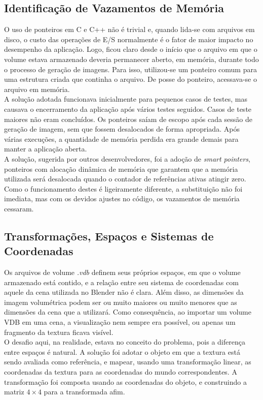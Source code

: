 \subsection*{Identificação de Vazamentos de Memória}
O uso de ponteiros em C e C++ não é trivial e, quando lida-se com arquivos em disco, o custo das operações de E/S normalmente é o fator de maior impacto no desempenho da aplicação. Logo, ficou claro desde o início que o arquivo em que o volume estava armazenado deveria permanecer aberto, em memória, durante todo o processo de geração de imagens. Para isso, utilizou-se um ponteiro comum para uma estrutura criada que continha o arquivo. De posse do ponteiro, acessava-se o arquivo em memória.\\

A solução adotada funcionava inicialmente para pequenos casos de testes, mas causava o encerramento da aplicação após vários testes seguidos. Casos de teste maiores não eram concluídos. Os ponteiros saíam de escopo após cada sessão de geração de imagem, sem que fossem desalocados de forma apropriada. Após várias execuções, a quantidade de memória perdida era grande demais para manter a aplicação aberta.\\

A solução, sugerida por outros desenvolvedores, foi a adoção de \emph{smart pointers}, ponteiros com alocação dinâmica de memória que garantem que a memória utilizada será desalocada quando o contador de referências ativas atingir zero. Como o funcionamento destes é ligeiramente diferente, a substituição não foi imediata, mas com os devidos ajustes no código, os vazamentos de memória cessaram.

\subsection*{Transformações, Espaços e Sistemas de Coordenadas}
Os arquivos de volume {\it .vdb} definem seus próprios espaços, em que o volume armazenado está contido, e a relação entre seu sistema de coordenadas com aquele da cena utilizada no Blender não é clara. Além disso, as dimensões da imagem volumétrica podem ser ou muito maiores ou muito menores que as dimensões da cena que a utilizará. Como consequência, ao importar um volume VDB em uma cena, a visualização nem sempre era possível, ou apenas um fragmento da textura ficava visível. \\

O desafio aqui, na realidade, estava no conceito do problema, pois a diferença entre espaços é natural. A solução foi adotar o objeto em que a textura está sendo avaliada como referência, e mapear, usando uma transformação linear, as coordenadas da textura para as coordenadas do mundo correspondentes. A transformação foi composta usando as coordenadas do objeto, e construindo a matriz $4 \times 4$ para a transformada afim.

